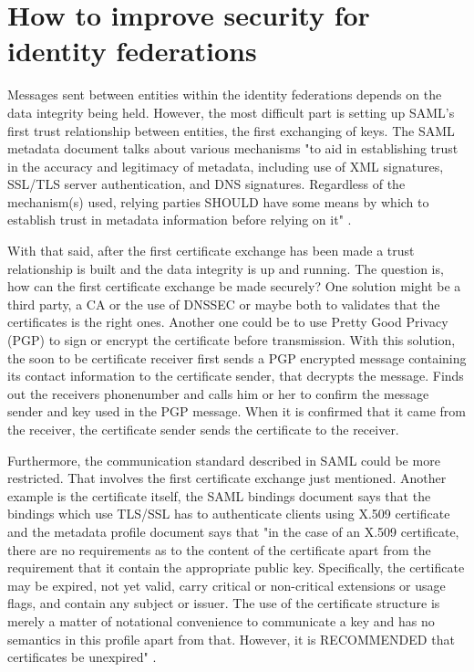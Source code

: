 \section{How to improve security for identity federations}

Messages sent between entities within the identity federations depends on the data integrity being held.
However, the most difficult part is setting up SAML's first trust relationship between entities, the first exchanging of keys.
The SAML metadata document talks about various mechanisms "to aid in establishing trust in the accuracy and legitimacy of metadata,
including use of XML signatures, SSL/TLS server authentication, and DNS signatures.
Regardless of the mechanism(s) used, relying parties SHOULD have some means by which to establish trust in metadata information
before relying on it" \cite[p.~29]{pdf:oasis-open-metadata}.

With that said, after the first certificate exchange has been made a trust relationship is built and the data integrity is up and running. 
The question is, how can the first certificate exchange be made securely? 
One solution might be a third party, a CA or the use of DNSSEC or maybe both to validates that the certificates is the right ones.
Another one could be to use Pretty Good Privacy (PGP)  \cite{rfc:2440} to sign or encrypt the certificate before transmission.
With this solution, the soon to be certificate receiver first sends a PGP encrypted message containing its contact
information to the certificate sender, that decrypts the message. Finds out the receivers phonenumber and calls him or her
to confirm the message sender and key used in the PGP message.
When it is confirmed that it came from the receiver, the certificate sender sends the certificate to the receiver.

Furthermore, the communication standard described in SAML could be more restricted.
That involves the first certificate exchange just mentioned. 
Another example is the certificate itself, the SAML bindings document says  
that the bindings which use TLS/SSL has to authenticate clients using X.509 certificate \cite[p.~8]{pdf:oasis-open-bindings} and the metadata profile document says that 
"in the case of an X.509 certificate, there are no requirements as to the content of the certificate apart from the requirement 
that it contain the appropriate public key. 
Specifically, the certificate may be expired, not yet valid, carry critical or non-critical extensions or usage flags, and contain 
any subject or issuer. 
The use of the certificate structure is merely a matter of notational convenience to communicate a key and has no semantics in this 
profile apart from that. 
However, it is RECOMMENDED that certificates be unexpired" \cite[p.~11]{pdf:oasis-open-metadata-profile}. 

